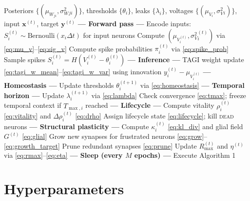 \documentclass[12pt, a4paper]{article}
\newcommand{\mW}{\mu_{W}}
\newcommand{\sW}{\sigma^{2}_{W}}
\newcommand{\mV}{\mu_{V}}
\newcommand{\sV}{\sigma^{2}_{V}}
\begin{document}
\begin{algorithm}[H]
\caption{TAGI-SNN: one training step at time $t$}
\begin{algorithmic}[1]
\Require Posteriors $\{(\mW_{ji}, \sW_{ji})\}$, thresholds $\{\theta_i\}$, leaks
    $\{\lambda_i\}$, voltages $\{(\mV_i, \sV_i)\}$, input $\bm{x}^{(t)}$, target
    $\bm{y}^{(t)}$
\Statex
\textbf{--- Forward pass ---}
\State Encode inputs: $S_i^{(t)} \sim \text{Bernoulli}(x_i \Delta t)$ for input neurons
\State Compute $(\mV_i^{(t)}, \sV_i^{(t)})$ via \eqref{eq:mu_v}--\eqref{eq:sig_v}
\State Compute spike probabilities $\pi_i^{(t)}$ via \eqref{eq:spike_prob}
\State Sample spikes $S_i^{(t)} = H(V_i^{(t)} - \theta_i^{(t)})$
\Statex
\textbf{--- Inference ---}
\State TAGI weight update \eqref{eq:tagi_w_mean}--\eqref{eq:tagi_w_var} using
    innovation $y_i^{(t)} - \mV_i^{(t)}$
\Statex
\textbf{--- Homeostasis ---}
\State Update thresholds $\theta_i^{(t+1)}$ via \eqref{eq:homeostasis}
\Statex
\textbf{--- Temporal horizon ---}
\State Update $\lambda_i^{(t+1)}$ via \eqref{eq:lambda}
\State Check convergence \eqref{eq:tmax}; freeze temporal context if $T_{\max,i}$ reached
\Statex
\textbf{--- Lifecycle ---}
\State Compute vitality $\rho_i^{(t)}$ \eqref{eq:vitality} and $\Delta\rho_i^{(t)}$ \eqref{eq:drho}
\State Assign lifecycle state \eqref{eq:lifecycle}; kill \textsc{dead} neurons
\Statex
\textbf{--- Structural plasticity ---}
\State Compute $\kappa_i^{(t)}$ \eqref{eq:kl_div} and glial field $G^{(t)}$ \eqref{eq:glial}
\State Grow new synapses for frustrated neurons \eqref{eq:grow}--\eqref{eq:growth_target}
\State Prune redundant synapses \eqref{eq:prune}
\State Update $R_{\max}^{(t)}$ and $\eta^{(t)}$ via \eqref{eq:rmax}--\eqref{eq:eta}
\Statex
\textbf{--- Sleep (every $M$ epochs) ---}
\State Execute Algorithm 1
\end{algorithmic}
\end{algorithm}

\section{Hyperparameters}
\label{sec:hyperparams}
\end{document}
